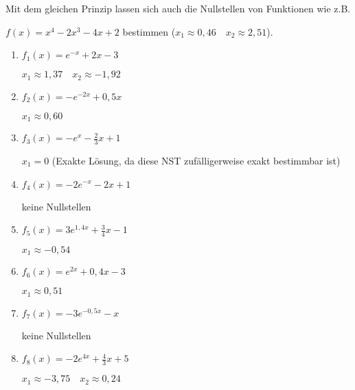 Mit dem gleichen Prinzip lassen sich auch die Nullstellen von Funktionen wie z.B.

\(f(x)=x^4-2x^3-4x+2\) bestimmen (\(x_1\approx 0,46\quad x_2\approx 2,51\)).

\begin{Exercise}[title={Prüfe an Hand deiner Skizze, ob die Funktionen aus Aufg. \ref{schAsyA1} NST haben und bestimme diese auf 2 Nachkommastellen genau.}, label=NSTnaeherungA1]
\end{Exercise}

\begin{Answer}[ref=NSTnaeherungA1]

	\begin{minipage}{\textwidth}
		\begin{minipage}{0.49\textwidth}
			\begin{enumerate}[label=\alph*)]
				\item \(f_1(x)=e^{-x}+2x-3\)

				\(x_1\approx 1,37\quad x_2\approx -1,92\)
				\item \(f_2(x)=-e^{-2x}+0,5x\)

				\(x_1\approx 0,60\)
				\item \(f_3(x)=-e^{x}-\frac{2}{3}x+1\)

				\(x_1=0\) (Exakte Lösung, da diese NST zufälligerweise exakt bestimmbar ist)
				\item \(f_4(x)=-2e^{-x}-2x+1\)

				keine Nullstellen
			\end{enumerate}
		\end{minipage}
		\begin{minipage}{0.49\textwidth}
			\begin{enumerate}[label=\alph*)]
				\setcounter{enumi}{4}
				\item \(f_5(x)=3e^{1,4x}+\frac{3}{4}x-1\)

				\(x_1\approx -0,54\)
				\item \(f_6(x)=e^{2x}+0,4x-3\)

				\(x_1\approx 0,51\)
				\item \(f_7(x)=-3e^{-0,5x}-x\)

				keine Nullstellen
				\item \(f_8(x)=-2e^{4x}+\frac{4}{3}x+5\)

				\(x_1\approx -3,75\quad x_2\approx 0,24\)
			\end{enumerate}
		\end{minipage}
	\end{minipage}
\end{Answer}